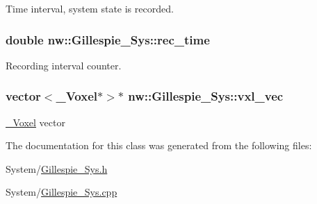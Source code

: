 Time interval, system state is recorded. 

\hypertarget{classnw_1_1_gillespie___sys_a2209a66c1cd88b06fb8a0e8b41d72b29}{
\subsubsection[{rec\+\_\+time}]{\setlength{\rightskip}{0pt plus 5cm}double nw\+::\+Gillespie\+\_\+\+Sys\+::rec\+\_\+time\hspace{0.3cm}{\ttfamily [private]}}}\label{classnw_1_1_gillespie___sys_a2209a66c1cd88b06fb8a0e8b41d72b29}


Recording interval counter. 

\hypertarget{classnw_1_1_gillespie___sys_acf4d19490ed7a8447296d7c206ef0590}{
\subsubsection[{vxl\+\_\+vec}]{\setlength{\rightskip}{0pt plus 5cm}vector$<${\bf \+\_\+\+Voxel}$\ast$$>$$\ast$ nw\+::\+Gillespie\+\_\+\+Sys\+::vxl\+\_\+vec\hspace{0.3cm}{\ttfamily [private]}}}\label{classnw_1_1_gillespie___sys_acf4d19490ed7a8447296d7c206ef0590}


\hyperlink{classnw_1_1___voxel}{\+\_\+\+Voxel} vector 



The documentation for this class was generated from the following files\+:\begin{DoxyCompactItemize}
\item 
System/\hyperlink{_gillespie___sys_8h}{Gillespie\+\_\+\+Sys.\+h}\item 
System/\hyperlink{_gillespie___sys_8cpp}{Gillespie\+\_\+\+Sys.\+cpp}\end{DoxyCompactItemize}
